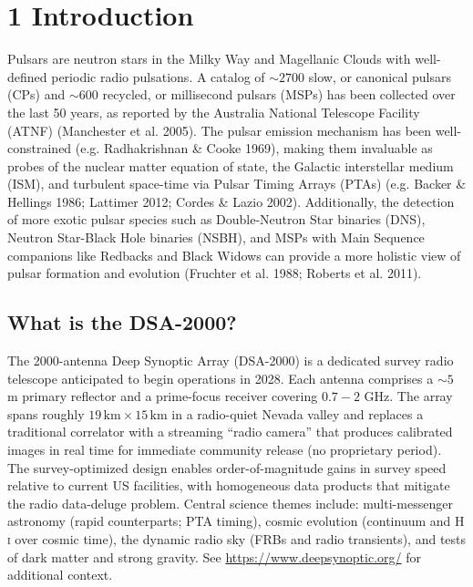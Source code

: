 \documentclass[10pt]{article}
\begin{document}
\section*{1 Introduction}
Pulsars are neutron stars in the Milky Way and Magellanic Clouds with well-defined periodic radio pulsations. A catalog of \(\sim 2700\) slow, or canonical pulsars (CPs) and \(\sim 600\) recycled, or millisecond pulsars (MSPs) has been collected over the last 50 years, as reported by the Australia National Telescope Facility (ATNF) (Manchester et al. 2005). The pulsar emission mechanism has been well-constrained (e.g. Radhakrishnan \& Cooke 1969), making them invaluable as probes of the nuclear matter equation of state, the Galactic interstellar medium (ISM), and turbulent space-time via Pulsar Timing Arrays (PTAs) (e.g. Backer \& Hellings 1986; Lattimer 2012; Cordes \& Lazio 2002). Additionally, the detection of more exotic pulsar species such as Double-Neutron Star binaries (DNS), Neutron Star-Black Hole binaries (NSBH), and MSPs with Main Sequence companions like Redbacks and Black Widows can provide a more holistic view of pulsar formation and evolution (Fruchter et al. 1988; Roberts et al. 2011).

\subsection*{What is the DSA-2000?}
The 2000-antenna Deep Synoptic Array (DSA-2000) is a dedicated survey radio telescope anticipated to begin operations in 2028. Each antenna comprises a \(\sim 5\) m primary reflector and a prime-focus receiver covering \(0.7{-}2\) GHz. The array spans roughly \(19\,\mathrm{km} \times 15\,\mathrm{km}\) in a radio-quiet Nevada valley and replaces a traditional correlator with a streaming ``radio camera'' that produces calibrated images in real time for immediate community release (no proprietary period). The survey-optimized design enables order-of-magnitude gains in survey speed relative to current US facilities, with homogeneous data products that mitigate the radio data-deluge problem. Central science themes include: multi-messenger astronomy (rapid counterparts; PTA timing), cosmic evolution (continuum and H\,\textsc{i} over cosmic time), the dynamic radio sky (FRBs and radio transients), and tests of dark matter and strong gravity. See \url{https://www.deepsynoptic.org/} for additional context.
\end{document}
